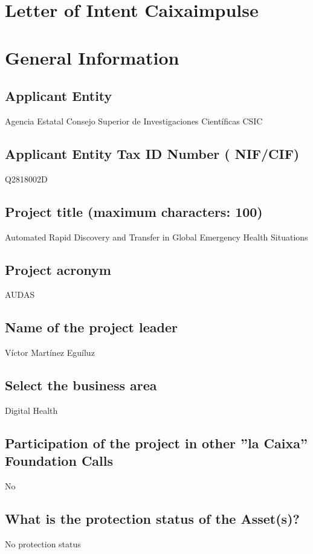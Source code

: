 \documentclass[authoryear,1p,12pt]{elsarticle}
\begin{document}
\section*{{\bf Letter of Intent Caixa{\bf impulse}}}

\section{{\bf General Information}}

\subsection{{\bf Applicant Entity}}
Agencia Estatal Consejo Superior de Investigaciones Cient\'ificas CSIC

\subsection{{\bf Applicant Entity Tax ID Number ( NIF/CIF)}}
Q2818002D

\subsection{{\bf Project title (maximum characters: 100)}}
Automated Rapid Discovery and Transfer in Global Emergency Health Situations

\subsection{{\bf Project acronym}}
AUDAS

\subsection{{\bf Name of the project leader}}
V\'ictor Mart\'inez Egu\'iluz

\subsection{{\bf Select the business area}}
Digital Health

\subsection{{\bf Participation of the project in other ''la Caixa'' Foundation Calls}}
No

\subsection{{\bf What is the protection status of the Asset(s)?}}
No protection status
\end{document}
